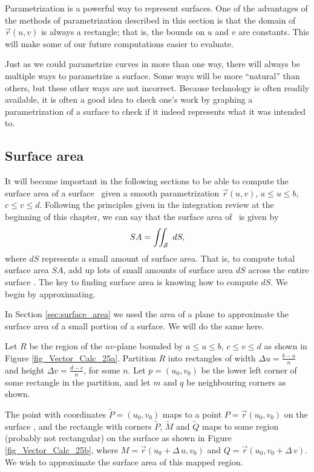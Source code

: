 Parametrization is a powerful way to represent surfaces. One of the advantages of the methods of parametrization described in this section is that the domain of $\vec r(u,v)$ is always a rectangle; that is, the bounds on $u$ and $v$ are constants. This will make some of our future computations easier to evaluate.

Just as we could parametrize curves in more than one way, there will always be multiple ways to parametrize a surface. Some ways will be more ``natural'' than others, but these other ways are not incorrect. Because technology is often readily available, it is often a good idea to check one's work by graphing a parametrization of a surface to check if it indeed represents what it was intended to.



\subsection{Surface area}
It will become important in the following sections to be able to compute the surface area of a surface \surfaceS\ given a smooth parametrization $\vec r(u,v)$, $a\leq u\leq b$, $c\leq v\leq d$. Following the principles given in the integration review at the beginning of this chapter, we can say that the surface area of \surfaceS\ is given by
$$SA = \iint_{\mathcal{S}}\ dS,$$
where $dS$ represents a small amount of surface area. That is, to compute total surface area $SA$, add up lots of small amounts of surface area $dS$ across the entire surface \surfaceS. The key to finding surface area is knowing how to compute $dS$. We begin by approximating.

In Section \ref{sec:surface_area} we used the area of a plane to approximate the surface area of a small portion of a surface. We will do the same here.

Let $R$ be the region of the $uv$-plane bounded by $a\leq u\leq b$, $c\leq v\leq d$ as shown in Figure \ref{fig_Vector_Calc_25a}. Partition $R$ into rectangles of width $\Delta u = \frac{b-a}n$ and height $\Delta v = \frac{d-c}n$, for some $n$. Let $p=(u_0,v_0)$ be the lower left corner of some rectangle in the partition, and let $m$ and $q$ be neighbouring corners as shown.

The point with coordinates $\widetilde{P}=(u_0,v_0)$ maps to a point $P = \vec r(u_0,v_0)$ on the surface \surfaceS, and the rectangle with corners $\widetilde{P}$, $\widetilde{M}$ and $\widetilde{Q}$ maps to some region (probably not rectangular) on the surface as shown in Figure \ref{fig_Vector_Calc_25b}, where $M = \vec r(u_0+\Delta\,u,v_0)$ and $Q = \vec r(u_0,v_0+\Delta\,v)$. We wish to approximate the surface area of this mapped region.

